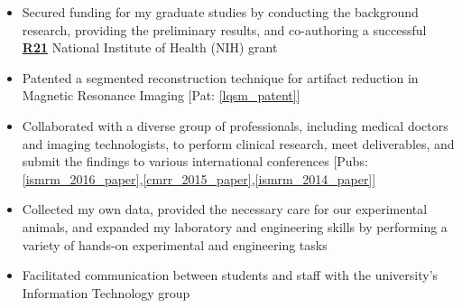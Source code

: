 \begin{minipage}{\textwidth}
	\begin{itemize}
	\item Secured funding for my graduate studies by conducting the background research, providing the preliminary results, and co-authoring a successful \href{https://grants.nih.gov/grants/funding/r21.htm}{\textbf{R21}} National Institute of Health (NIH) grant
   	\item Patented a segmented reconstruction technique for artifact reduction in Magnetic Resonance Imaging [Pat: \ref{lqsm_patent}]
	\item Collaborated with a diverse group of professionals, including medical doctors and imaging technologists, to perform clinical research, meet deliverables, and submit the findings to various international conferences [Pubs: \ref{ismrm_2016_paper},\ref{cmrr_2015_paper},\ref{ismrm_2014_paper}]
	\item Collected my own data, provided the necessary care for our experimental animals, and expanded my laboratory and engineering skills by performing a variety of hands-on experimental and engineering tasks
	\item Facilitated communication between students and staff with the university's Information Technology group

\end{itemize}
\end{minipage}
